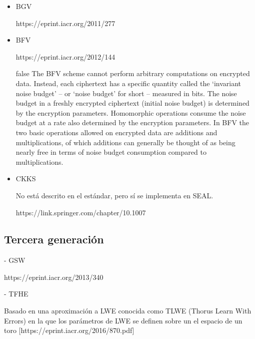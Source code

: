 \begin{itemize}
    \item BGV
    
    https://eprint.iacr.org/2011/277

    \item BFV
    
    https://eprint.iacr.org/2012/144

    \if false
    The BFV scheme cannot perform arbitrary computations on encrypted data.
        Instead, each ciphertext has a specific quantity called the `invariant noise
        budget' -- or `noise budget' for short -- measured in bits. The noise budget
        in a freshly encrypted ciphertext (initial noise budget) is determined by
        the encryption parameters. Homomorphic operations consume the noise budget
        at a rate also determined by the encryption parameters. In BFV the two basic
        operations allowed on encrypted data are additions and multiplications, of
        which additions can generally be thought of as being nearly free in terms of
        noise budget consumption compared to multiplications.
    \fi
    

    \item CKKS
    
    No está descrito en el estándar, pero sí se implementa en SEAL.

    https://link.springer.com/chapter/10.1007%
    
\end{itemize}

\subsection{Tercera generación}

- GSW

https://eprint.iacr.org/2013/340

- TFHE

Basado en una aproximación a LWE conocida como TLWE (Thorus Learn With Errors) en la que los parámetros de LWE se definen sobre un el espacio de un toro \cite{cheon_faster_2016} [https://eprint.iacr.org/2016/870.pdf]